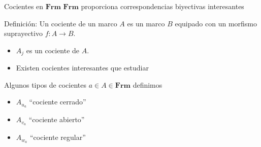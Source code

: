 \documentclass[compress,12pt]{beamer}
\begin{document}
\begin{frame}{Cocientes en $\mathbf{Frm}$}
$\mathbf{Frm}$ proporciona correspondencias biyectivas interesantes

\end{frame}

\begin{frame}
\begin{block}{Definición:}
    Un cociente de un marco $A$ es un marco $B$ equipado con un morfismo suprayectivo $f\colon A\to B$.
\end{block}
\begin{itemize}
\item<3-> $A_j$ es un cociente de $A$.
\item<4-> Existen cocientes interesantes que estudiar
\end{itemize}
\end{frame}

\begin{frame}{Algunos tipos de cocientes}
    $a\in A\in \mathbf{Frm}$ definimos
    
    \begin{itemize}
    \item<3-> $A_{u_a}$ ``cociente cerrado'' 
    \item<4-> $A_{v_a}$ ``cociente abierto'' 
    \item<5-> $A_{w_a}$ ``cociente regular'' 
    \end{itemize}
    
    \end{frame}
\end{document}
